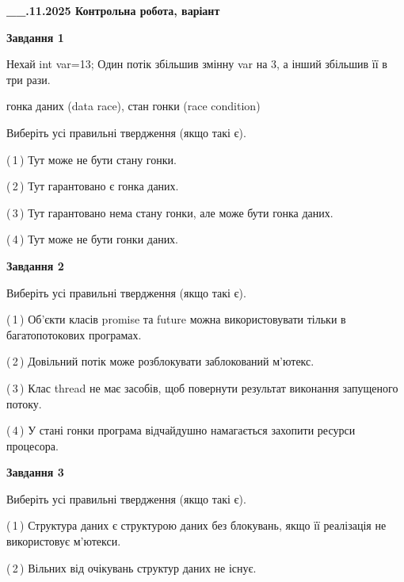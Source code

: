 \documentclass[12pt, ukrainian]{article}
\begin{document}
\begin {large}

\textbf{\_\_.11.2025 Контрольна робота, варіант  }\par


{

\begin{center}
\textbf{Завдання 1}
\end{center}
Нехай int var=13; Один потік збільшив змінну var на 3, а інший збільшив її в три рази.

гонка даних (data race), стан гонки (race condition)

Виберіть усі правильні твердження (якщо такі є).\par
\vspace{2mm}
(\,1\,) Тут може не бути стану гонки.%

(\,2\,) Тут гарантовано є гонка даних.%

(\,3\,) Тут гарантовано нема стану гонки, але може бути гонка даних.%

(\,4\,) Тут може не бути гонки даних.%



\begin{center}
\textbf{Завдання 2}
\end{center}
Виберіть усі правильні твердження (якщо такі є).\par
\vspace{2mm}

(\,1\,) Об’єкти класів promise та future можна використовувати тільки в багатопотокових програмах.%

(\,2\,) Довільний потік може розблокувати заблокований м’ютекс.%

(\,3\,) Клас thread не має засобів, щоб повернути результат виконання запущеного потоку.%

(\,4\,) У стані гонки програма відчайдушно намагається захопити ресурси процесора.%



\begin{center}
\textbf{Завдання 3}
\end{center}
Виберіть усі правильні твердження (якщо такі є).\par
\vspace{2mm}

(\,1\,) Структура даних є структурою даних без блокувань, якщо її реалізація не використовує м’ютекси.%

(\,2\,) Вільних від очікувань структур даних не існує.%

}
\end{large}
\end{document}
